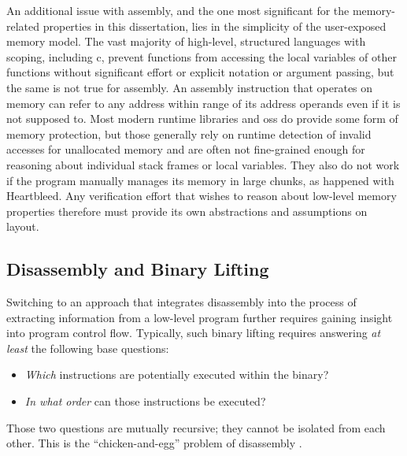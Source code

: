 An additional issue with assembly, and the one most significant for the memory-related properties in this dissertation, lies in the simplicity of the user-exposed memory model.
The vast majority of high-level, structured languages with scoping, including \gls{c}, prevent functions from accessing the local variables of other functions without significant effort or explicit notation or argument passing, but the same is not true for assembly.
An assembly instruction that operates on memory can refer to any address within range of its address operands even if it is not supposed to.
Most modern runtime libraries and \glspl{os} do provide some form of memory protection, but those generally rely on runtime detection of invalid accesses for unallocated memory and are often not fine-grained enough for reasoning about individual stack frames or local variables.
They also do not work if the program manually manages its memory in large chunks, as happened with Heartbleed.
Any verification effort that wishes to reason about low-level memory properties therefore must provide its own abstractions and assumptions on layout.

\subsection{Disassembly and Binary Lifting}\label{challenges-disassembly}
Switching to an approach that integrates disassembly into the process of extracting information from a low-level program further requires gaining insight into program control flow.
Typically, such binary lifting requires answering \emph{at least} the following base questions:
\begin{itemize}
  \item \emph{Which} instructions are potentially executed within the binary?
  \item \emph{In what order} can those instructions be executed?
\end{itemize}
Those two questions are mutually recursive; they cannot be isolated from each other.
This is the ``chicken-and-egg'' problem of disassembly \autocite{schwartz2002disassembly}.

